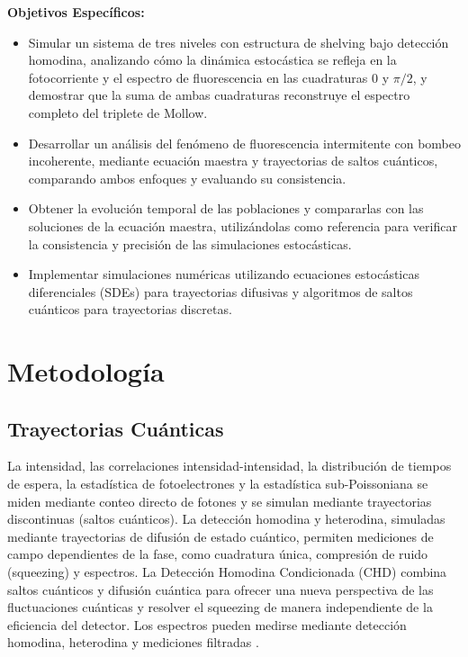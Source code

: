 \documentclass[12pt]{article}
\begin{document}
\textbf{Objetivos Específicos:}

\begin{itemize}
    \item Simular un sistema de tres niveles con estructura de shelving bajo detección homodina, analizando cómo la dinámica estocástica se refleja en la fotocorriente y el espectro de fluorescencia en las cuadraturas $0$ y $\pi/2$, y demostrar que la suma de ambas cuadraturas reconstruye el espectro completo del triplete de Mollow.
    
    \item Desarrollar un análisis del fenómeno de fluorescencia intermitente con bombeo incoherente, mediante ecuación maestra y trayectorias de saltos cuánticos, comparando ambos enfoques y evaluando su consistencia.
    
    \item Obtener la evolución temporal de las poblaciones y compararlas con las soluciones de la ecuación maestra, utilizándolas como referencia para verificar la consistencia y precisión de las simulaciones estocásticas.
    
    \item Implementar simulaciones numéricas utilizando ecuaciones estocásticas diferenciales (SDEs) para trayectorias difusivas y algoritmos de saltos cuánticos para trayectorias discretas.

\end{itemize}

\section{Metodología}
\subsection{Trayectorias Cuánticas}
La intensidad, las correlaciones intensidad-intensidad, la distribución de tiempos de espera, la estadística de fotoelectrones y la estadística sub-Poissoniana se miden mediante conteo directo de fotones y se simulan mediante trayectorias discontinuas (saltos cuánticos). La detección homodina y heterodina, simuladas mediante trayectorias de difusión de estado cuántico, permiten mediciones de campo dependientes de la fase, como cuadratura única, compresión de ruido (squeezing) y espectros. La Detección Homodina Condicionada (CHD) combina saltos cuánticos y difusión cuántica para ofrecer una nueva perspectiva de las fluctuaciones cuánticas y resolver el squeezing de manera independiente de la eficiencia del detector. Los espectros pueden medirse mediante detección homodina, heterodina y mediciones filtradas \cite{TiCa92,Holland98}.
\end{document}
